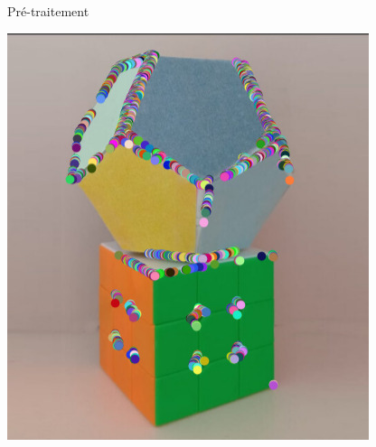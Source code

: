 \begin{frame}{Pré-traitement}
\begin{minipage}{0.48\linewidth}
    \includegraphics[width=\linewidth]{capture/test_detection_1_moravec_2_500.jpeg}
  \end{minipage}
\end{frame}

